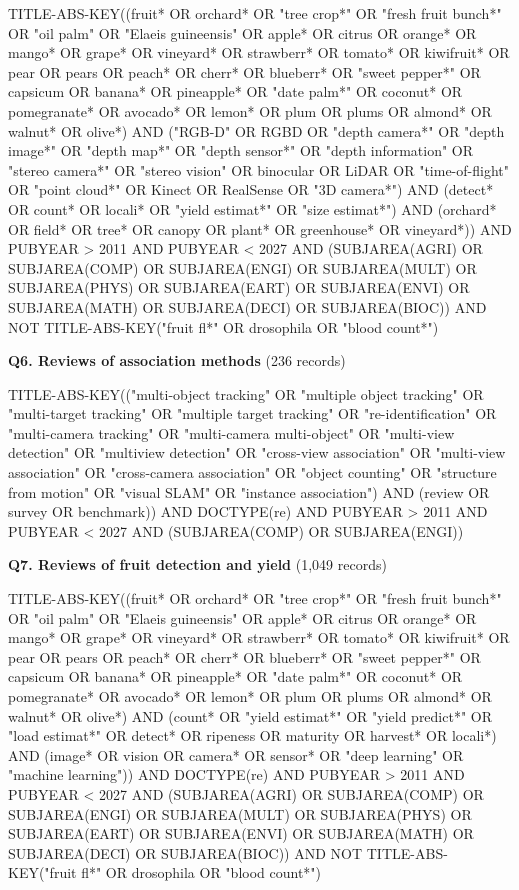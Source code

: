 {\noindent\scriptsize\ttfamily\raggedright TITLE-ABS-KEY((fruit* OR orchard* OR "tree crop*" OR "fresh fruit bunch*" OR "oil palm" OR "Elaeis guineensis" OR apple* OR citrus OR orange* OR mango* OR grape* OR vineyard* OR strawberr* OR tomato* OR kiwifruit* OR pear OR pears OR peach* OR cherr* OR blueberr* OR "sweet pepper*" OR capsicum OR banana* OR pineapple* OR "date palm*" OR coconut* OR pomegranate* OR avocado* OR lemon* OR plum OR plums OR almond* OR walnut* OR olive*) AND ("RGB-D" OR RGBD OR "depth camera*" OR "depth image*" OR "depth map*" OR "depth sensor*" OR "depth information" OR "stereo camera*" OR "stereo vision" OR binocular OR LiDAR OR "time-of-flight" OR "point cloud*" OR Kinect OR RealSense OR "3D camera*") AND (detect* OR count* OR locali* OR "yield estimat*" OR "size estimat*") AND (orchard* OR field* OR tree* OR canopy OR plant* OR greenhouse* OR vineyard*)) AND PUBYEAR > 2011 AND PUBYEAR < 2027 AND (SUBJAREA(AGRI) OR SUBJAREA(COMP) OR SUBJAREA(ENGI) OR SUBJAREA(MULT) OR SUBJAREA(PHYS) OR SUBJAREA(EART) OR SUBJAREA(ENVI) OR SUBJAREA(MATH) OR SUBJAREA(DECI) OR SUBJAREA(BIOC)) AND NOT TITLE-ABS-KEY("fruit fl*" OR drosophila OR "blood count*")\par}
\par\medskip\noindent\textbf{Q6. Reviews of association methods} (236 records)\par\nobreak\smallskip
{\noindent\scriptsize\ttfamily\raggedright TITLE-ABS-KEY(("multi-object tracking" OR "multiple object tracking" OR "multi-target tracking" OR "multiple target tracking" OR "re-identification" OR "multi-camera tracking" OR "multi-camera multi-object" OR "multi-view detection" OR "multiview detection" OR "cross-view association" OR "multi-view association" OR "cross-camera association" OR "object counting" OR "structure from motion" OR "visual SLAM" OR "instance association") AND (review OR survey OR benchmark)) AND DOCTYPE(re) AND PUBYEAR > 2011 AND PUBYEAR < 2027 AND (SUBJAREA(COMP) OR SUBJAREA(ENGI))\par}
\par\medskip\noindent\textbf{Q7. Reviews of fruit detection and yield} (1,049 records)\par\nobreak\smallskip
{\noindent\scriptsize\ttfamily\raggedright TITLE-ABS-KEY((fruit* OR orchard* OR "tree crop*" OR "fresh fruit bunch*" OR "oil palm" OR "Elaeis guineensis" OR apple* OR citrus OR orange* OR mango* OR grape* OR vineyard* OR strawberr* OR tomato* OR kiwifruit* OR pear OR pears OR peach* OR cherr* OR blueberr* OR "sweet pepper*" OR capsicum OR banana* OR pineapple* OR "date palm*" OR coconut* OR pomegranate* OR avocado* OR lemon* OR plum OR plums OR almond* OR walnut* OR olive*) AND (count* OR "yield estimat*" OR "yield predict*" OR "load estimat*" OR detect* OR ripeness OR maturity OR harvest* OR locali*) AND (image* OR vision OR camera* OR sensor* OR "deep learning" OR "machine learning")) AND DOCTYPE(re) AND PUBYEAR > 2011 AND PUBYEAR < 2027 AND (SUBJAREA(AGRI) OR SUBJAREA(COMP) OR SUBJAREA(ENGI) OR SUBJAREA(MULT) OR SUBJAREA(PHYS) OR SUBJAREA(EART) OR SUBJAREA(ENVI) OR SUBJAREA(MATH) OR SUBJAREA(DECI) OR SUBJAREA(BIOC)) AND NOT TITLE-ABS-KEY("fruit fl*" OR drosophila OR "blood count*")\par}
